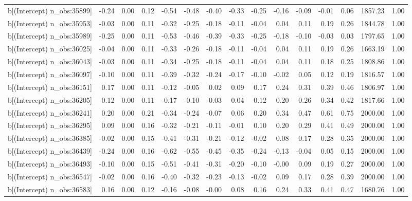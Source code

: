 \begin{table}[ht]
\begin{tabular}{rrrrrrrrrrrrrrr}
  b[(Intercept) n\_obs:35899] & -0.24 & 0.00 & 0.12 & -0.54 & -0.48 & -0.40 & -0.33 & -0.25 & -0.16 & -0.09 & -0.01 & 0.06 & 1857.23 & 1.00 \\ 
  b[(Intercept) n\_obs:35953] & -0.03 & 0.00 & 0.11 & -0.32 & -0.25 & -0.18 & -0.11 & -0.04 & 0.04 & 0.11 & 0.19 & 0.26 & 1844.78 & 1.00 \\ 
  b[(Intercept) n\_obs:35989] & -0.25 & 0.00 & 0.11 & -0.53 & -0.46 & -0.39 & -0.33 & -0.25 & -0.18 & -0.10 & -0.03 & 0.03 & 1797.65 & 1.00 \\ 
  b[(Intercept) n\_obs:36025] & -0.04 & 0.00 & 0.11 & -0.33 & -0.26 & -0.18 & -0.11 & -0.04 & 0.04 & 0.11 & 0.19 & 0.26 & 1663.19 & 1.00 \\ 
  b[(Intercept) n\_obs:36043] & -0.03 & 0.00 & 0.11 & -0.34 & -0.25 & -0.18 & -0.11 & -0.04 & 0.04 & 0.11 & 0.18 & 0.25 & 1808.86 & 1.00 \\ 
  b[(Intercept) n\_obs:36097] & -0.10 & 0.00 & 0.11 & -0.39 & -0.32 & -0.24 & -0.17 & -0.10 & -0.02 & 0.05 & 0.12 & 0.19 & 1816.57 & 1.00 \\ 
  b[(Intercept) n\_obs:36151] & 0.17 & 0.00 & 0.11 & -0.12 & -0.05 & 0.02 & 0.09 & 0.17 & 0.24 & 0.31 & 0.39 & 0.46 & 1806.97 & 1.00 \\ 
  b[(Intercept) n\_obs:36205] & 0.12 & 0.00 & 0.11 & -0.17 & -0.10 & -0.03 & 0.04 & 0.12 & 0.20 & 0.26 & 0.34 & 0.42 & 1817.66 & 1.00 \\ 
  b[(Intercept) n\_obs:36241] & 0.20 & 0.00 & 0.21 & -0.34 & -0.24 & -0.07 & 0.06 & 0.20 & 0.34 & 0.47 & 0.61 & 0.75 & 2000.00 & 1.00 \\ 
  b[(Intercept) n\_obs:36295] & 0.09 & 0.00 & 0.16 & -0.32 & -0.21 & -0.11 & -0.01 & 0.10 & 0.20 & 0.29 & 0.41 & 0.49 & 2000.00 & 1.00 \\ 
  b[(Intercept) n\_obs:36385] & -0.02 & 0.00 & 0.15 & -0.41 & -0.31 & -0.21 & -0.12 & -0.02 & 0.08 & 0.17 & 0.28 & 0.35 & 2000.00 & 1.00 \\ 
  b[(Intercept) n\_obs:36439] & -0.24 & 0.00 & 0.16 & -0.62 & -0.55 & -0.45 & -0.35 & -0.24 & -0.13 & -0.04 & 0.05 & 0.15 & 2000.00 & 1.00 \\ 
  b[(Intercept) n\_obs:36493] & -0.10 & 0.00 & 0.15 & -0.51 & -0.41 & -0.31 & -0.20 & -0.10 & -0.00 & 0.09 & 0.19 & 0.27 & 2000.00 & 1.00 \\ 
  b[(Intercept) n\_obs:36547] & -0.02 & 0.00 & 0.16 & -0.40 & -0.32 & -0.23 & -0.13 & -0.02 & 0.09 & 0.17 & 0.28 & 0.39 & 2000.00 & 1.00 \\ 
  b[(Intercept) n\_obs:36583] & 0.16 & 0.00 & 0.12 & -0.16 & -0.08 & -0.00 & 0.08 & 0.16 & 0.24 & 0.33 & 0.41 & 0.47 & 1680.76 & 1.00 \\ 

\end{tabular}
\end{table}
